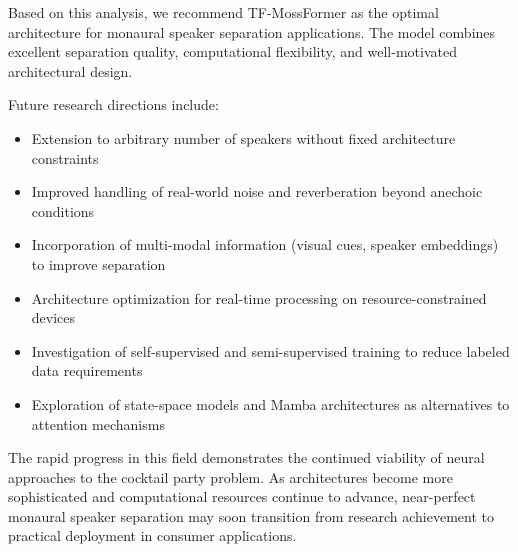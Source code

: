 \documentclass[conference]{IEEEtran}
\begin{document}
Based on this analysis, we recommend TF-MossFormer as the optimal architecture for monaural speaker separation applications. The model combines excellent separation quality, computational flexibility, and well-motivated architectural design.

Future research directions include:

\begin{itemize}
    \item Extension to arbitrary number of speakers without fixed architecture constraints
    \item Improved handling of real-world noise and reverberation beyond anechoic conditions
    \item Incorporation of multi-modal information (visual cues, speaker embeddings) to improve separation
    \item Architecture optimization for real-time processing on resource-constrained devices
    \item Investigation of self-supervised and semi-supervised training to reduce labeled data requirements
    \item Exploration of state-space models and Mamba architectures as alternatives to attention mechanisms
\end{itemize}

The rapid progress in this field demonstrates the continued viability of neural approaches to the cocktail party problem. As architectures become more sophisticated and computational resources continue to advance, near-perfect monaural speaker separation may soon transition from research achievement to practical deployment in consumer applications.
\end{document}
